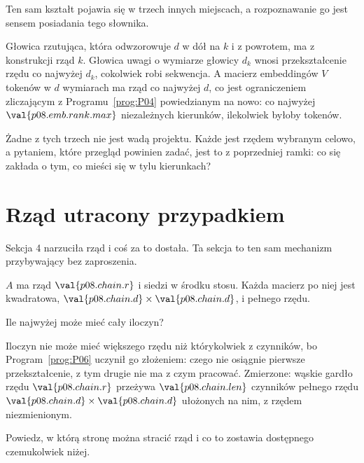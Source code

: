 \begin{fr}
\begin{aibox}
Ten sam kształt pojawia się w trzech innych miejscach, a rozpoznawanie go jest
sensem posiadania tego słownika.

Głowica rzutująca, która odwzorowuje $d$ w dół na $k$ i z powrotem, ma z
konstrukcji rząd $k$. Głowica uwagi o wymiarze głowicy $d_k$ wnosi
przekształcenie rzędu co najwyżej $d_k$, cokolwiek robi sekwencja. A macierz
embeddingów $V$ tokenów w $d$ wymiarach ma rząd co najwyżej $d$, co jest
ograniczeniem zliczającym z Programu~\ref{prog:P04} powiedzianym na nowo: co
najwyżej $\val{p08.emb.rank.max}$ niezależnych kierunków, ilekolwiek byłoby
tokenów.

Żadne z tych trzech nie jest wadą projektu. Każde jest rzędem wybranym celowo, a
pytaniem, które przegląd powinien zadać, jest to z poprzedniej ramki: co się
zakłada o tym, co mieści się w tylu kierunkach?
\end{aibox}
\end{fr}

\section{Rząd utracony przypadkiem}
\label{sec:P08-collapse}

\begin{fr}
Sekcja 4 narzuciła rząd i coś za to dostała. Ta sekcja to ten sam mechanizm
przybywający bez zaproszenia.

$A$ ma rząd $\val{p08.chain.r}$ i siedzi w środku stosu. Każda macierz po niej
jest kwadratowa, $\val{p08.chain.d} \times \val{p08.chain.d}$, i pełnego rzędu.

Ile najwyżej może mieć cały iloczyn?
\dotline
\nextframe
\end{fr}

\begin{fr}
Iloczyn nie może mieć większego rzędu niż którykolwiek z czynników, bo
Program~\ref{prog:P06} uczynił go złożeniem: czego nie osiągnie pierwsze
przekształcenie, z tym drugie nie ma z czym pracować. Zmierzone: wąskie gardło
rzędu $\val{p08.chain.r}$ przeżywa $\val{p08.chain.len}$ czynników pełnego
rzędu $\val{p08.chain.d} \times \val{p08.chain.d}$ ułożonych na nim, z rzędem
niezmienionym.

Powiedz, w którą stronę można stracić rząd i co to zostawia dostępnego
czemukolwiek niżej.
\dotline
\nextframe
\end{fr}

